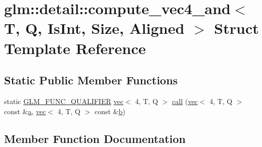 \hypertarget{structglm_1_1detail_1_1compute__vec4__and}{}\section{glm\+:\+:detail\+:\+:compute\+\_\+vec4\+\_\+and$<$ T, Q, Is\+Int, Size, Aligned $>$ Struct Template Reference}
\label{structglm_1_1detail_1_1compute__vec4__and}
\subsection*{Static Public Member Functions}
\begin{DoxyCompactItemize}
\item 
static \mbox{\hyperlink{setup_8hpp_a33fdea6f91c5f834105f7415e2a64407}{G\+L\+M\+\_\+\+F\+U\+N\+C\+\_\+\+Q\+U\+A\+L\+I\+F\+I\+ER}} \mbox{\hyperlink{structglm_1_1vec}{vec}}$<$ 4, T, Q $>$ \mbox{\hyperlink{structglm_1_1detail_1_1compute__vec4__and_a4d598ecb932a788803218d4cc2444c9a}{call}} (\mbox{\hyperlink{structglm_1_1vec}{vec}}$<$ 4, T, Q $>$ const \&\mbox{\hyperlink{_s_d_l__opengl__glext_8h_a3309789fc188587d666cda5ece79cf82}{a}}, \mbox{\hyperlink{structglm_1_1vec}{vec}}$<$ 4, T, Q $>$ const \&\mbox{\hyperlink{_s_d_l__opengl__glext_8h_a0f71581a41fd2264c8944126dabbd010}{b}})
\end{DoxyCompactItemize}


\subsection{Member Function Documentation}
\mbox{\label{structglm_1_1detail_1_1compute__vec4__and_a4d598ecb932a788803218d4cc2444c9a}} 

